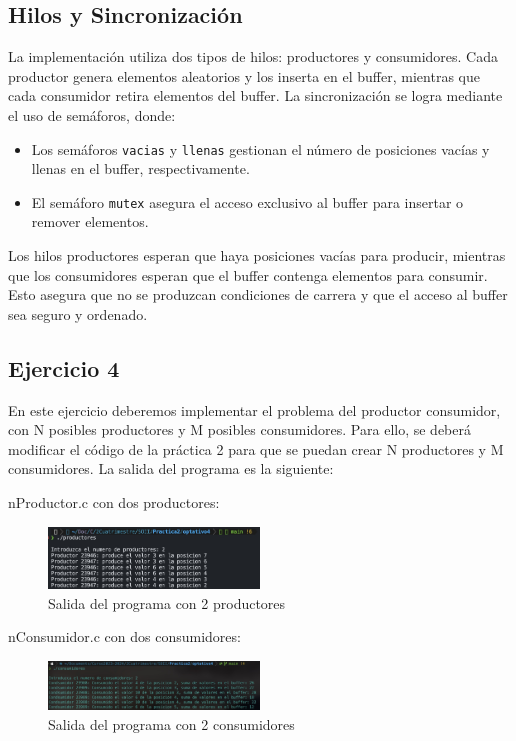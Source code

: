 \documentclass[twocolumn]{article}
\begin{document}
\subsection{Hilos y Sincronización}

La implementación utiliza dos tipos de hilos: productores y consumidores. Cada productor genera elementos aleatorios y los inserta en el buffer, mientras que cada consumidor retira elementos del buffer. La sincronización se logra mediante el uso de semáforos, donde:

\begin{itemize}
    \item Los semáforos \texttt{vacias} y \texttt{llenas} gestionan el número de posiciones vacías y llenas en el buffer, respectivamente.
    \item El semáforo \texttt{mutex} asegura el acceso exclusivo al buffer para insertar o remover elementos.
\end{itemize}

Los hilos productores esperan que haya posiciones vacías para producir, mientras que los consumidores esperan que el buffer contenga elementos para consumir. Esto asegura que no se produzcan condiciones de carrera y que el acceso al buffer sea seguro y ordenado.

\subsection{Ejercicio 4}

En este ejercicio deberemos implementar el problema del productor consumidor, con N posibles productores y M posibles consumidores. Para ello, se deberá modificar el código de la práctica 2 para que se puedan crear N productores y M consumidores. La salida del programa es la siguiente:

nProductor.c con dos productores:
\begin{figure}[H]
    \centering
    \includegraphics[width=0.5\textwidth]{ejercicio4/productor2.jpg}
    \caption{Salida del programa con 2 productores} 
    \label{fig:my_label}
\end{figure}

nConsumidor.c con dos consumidores:

\begin{figure}[H]
    \centering
    \includegraphics[width=0.5\textwidth]{ejercicio4/consumidor2.jpg}
    \caption{Salida del programa con 2 consumidores} 
    \label{fig:my_label}
\end{figure}
\end{document}
